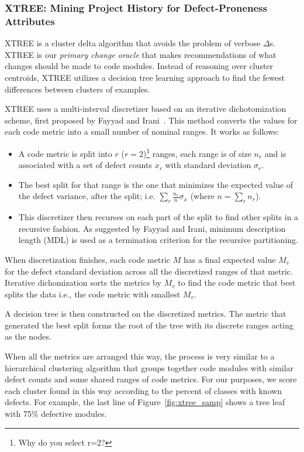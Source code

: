 \documentclass[twocolumn,5p]{elsarticle}
\newcommand{\fig}[1]{Figure~\ref{fig:#1}}
\theoremstyle{break}
\begin{document}
	\subsubsection{XTREE: Mining Project History for Defect-Proneness Attributes}
	
	XTREE  is a cluster delta algorithm
	that avoids the problem of verbose $\Delta$s.
	XTREE is our {\em primary change oracle} that makes recommendations 
	of what changes should be made to code modules.
	Instead of reasoning over cluster centroids,
	XTREE utilizes a decision tree learning approach
	to find the fewest differences between clusters of examples.
	
	
	XTREE uses a multi-interval discretizer based on an iterative dichotomization scheme, first proposed by Fayyad and Irani~\cite{fi}. This method converts the values for each code metric into a small number of nominal ranges. It works as follows:
	\begin{itemize}
		\item A code metric is split into $r$ ($r=2$)\footnote{Why do you select r=2?} ranges, each range is of
		size $n_r$ and is associated with a set of defect counts $x_r$ with standard deviation
		$\sigma_r$. 
		\item The best split for that range is the one that minimizes the expected value of the
		defect variance, after the split; i.e. $\sum_r\frac{n_r}{n}\sigma_x$ (where $n=\sum_r n_r$). 
		\item This discretizer then recurses on each part of the split to find other splits in a recursive fashion. As suggested by Fayyad and Irani, minimum description length (MDL) is used as a termination criterion for the recursive partitioning.
	\end{itemize}
	
	When discretization finishes, each code metric $M$ has a 
	final expected value $M_v$ for the defect standard deviation 
	across all the discretized ranges of that metric.
	Iterative dichomization sorts the metrics by $M_v$
	to find the code metric that best splits the data i.e., the code metric with smallest $M_v$. 
	
	A decision tree is then constructed on the discretized metrics. The metric that generated the best split forms the root of the tree with its discrete ranges acting as the nodes. 
	
	When all the metrics are arranged this way, the process is very similar to a hierarchical clustering algorithm that groups together code modules with similar defect counts and some shared ranges of code metrics.
	For our purposes, we score each cluster found in this way according
	to the percent of classes with known defects. For example, the last line of \fig{xtree_samp} shows a tree leaf with 75\%
	defective modules.
	
\end{document}

